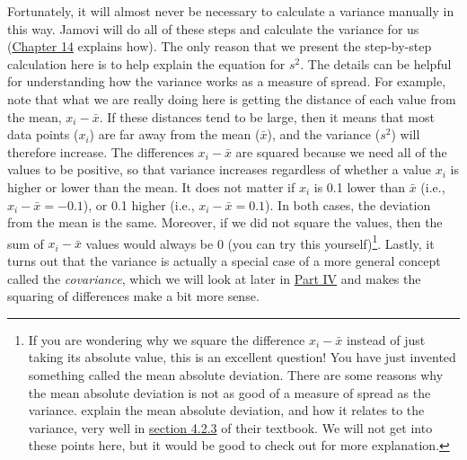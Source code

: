 \documentclass[
  openany]{scrbook}
\begin{document}
Fortunately, it will almost never be necessary to calculate a variance manually in this way.
Jamovi will do all of these steps and calculate the variance for us (\protect\hyperlink{Chapter_14}{Chapter 14} explains how).
The only reason that we present the step-by-step calculation here is to help explain the equation for \(s^{2}\).
The details can be helpful for understanding how the variance works as a measure of spread.
For example, note that what we are really doing here is getting the distance of each value from the mean, \(x_{i} - \bar{x}\).
If these distances tend to be large, then it means that most data points (\(x_{i}\)) are far away from the mean (\(\bar{x}\)), and the variance (\(s^{2}\)) will therefore increase.
The differences \(x_{i} - \bar{x}\) are squared because we need all of the values to be positive, so that variance increases regardless of whether a value \(x_{i}\) is higher or lower than the mean.
It does not matter if \(x_{i}\) is 0.1 lower than \(\bar{x}\) (i.e., \(x_{i} - \bar{x} = -0.1\)), or 0.1 higher (i.e., \(x_{i} - \bar{x} = 0.1\)).
In both cases, the deviation from the mean is the same.
Moreover, if we did not square the values, then the sum of \(x_{i} - \bar{x}\) values would always be 0 (you can try this yourself)\footnote{If you are wondering why we square the difference \(x_{i} - \bar{x}\) instead of just taking its absolute value, this is an excellent question! You have just invented something called the mean absolute deviation. There are some reasons why the mean absolute deviation is not as good of a measure of spread as the variance. \citet{Navarro2022} explain the mean absolute deviation, and how it relates to the variance, very well in \href{https://davidfoxcroft.github.io/lsj-book/04-Descriptive-statistics.html\#mean-absolute-deviation}{section 4.2.3} of their textbook. We will not get into these points here, but it would be good to check out \citet{Navarro2022} for more explanation.}.
Lastly, it turns out that the variance is actually a special case of a more general concept called the \emph{covariance}, which we will look at later in \protect\hyperlink{Week9}{Part IV} and makes the squaring of differences make a bit more sense.
\end{document}
